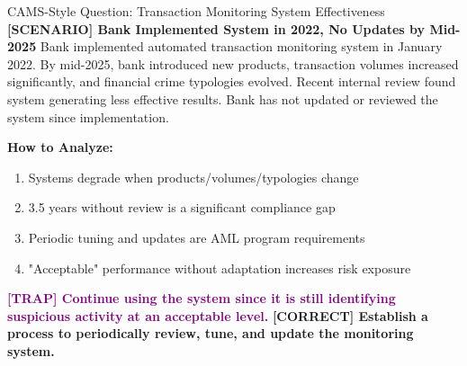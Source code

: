 \documentclass[11pt,a4paper]{beamer}
\newcommand{\trap}[1]{\textcolor{purple}{\textbf{[TRAP] #1}}}
\newcommand{\correct}[1]{\textcolor{green!50!black}{\textbf{[CORRECT] #1}}}
\newcommand{\scenario}[1]{\textcolor{blue!70!black}{\textbf{[SCENARIO] #1}}}
\begin{document}
\begin{frame}{CAMS-Style Question: Transaction Monitoring System Effectiveness}
	\scenario{Bank Implemented System in 2022, No Updates by Mid-2025}
	Bank implemented automated transaction monitoring system in January 2022. By mid-2025, bank introduced new products, transaction volumes increased significantly, and financial crime typologies evolved. Recent internal review found system generating less effective results. Bank has not updated or reviewed the system since implementation.
	
	\vspace{0.1cm}
	\textbf{How to Analyze:}
	\begin{enumerate}
		\item Systems degrade when products/volumes/typologies change
		\item 3.5 years without review is a significant compliance gap
		\item Periodic tuning and updates are AML program requirements
		\item "Acceptable" performance without adaptation increases risk exposure
	\end{enumerate}
	\trap{Continue using the system since it is still identifying suspicious activity at an acceptable level.}
	\correct{Establish a process to periodically review, tune, and update the monitoring system.}
\end{frame}
\end{document}
